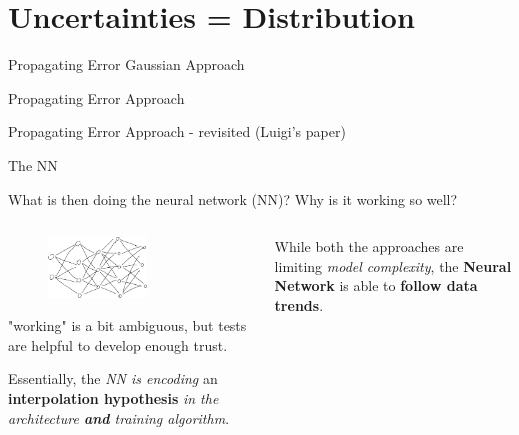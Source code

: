 \documentclass[9pt]{beamer}
\begin{document}
\section{Uncertainties = Distribution}

\begin{frame}{Propagating Error}
    Gaussian Approach
\end{frame}

\begin{frame}{Propagating Error}
    \nnpdf{} Approach
\end{frame}

\begin{frame}{Propagating Error}
    \nnpdf{} Approach - revisited (Luigi's paper)
\end{frame}


\begin{frame}{The NN}
    \begin{center}
        What is then doing the neural network (NN)? Why is it working so well?
    \end{center}
    \vspace*{10pt}

    \begin{columns}
        \begin{column}{0.5\textwidth}
            \begin{figure}
                \centering
                \includegraphics[width=0.6\textwidth]{nn}
            \end{figure}
            "working" is a bit ambiguous, but tests are helpful to develop
            enough trust.

            \vspace*{10pt}
                Essentially, the \textit{NN is encoding} an
                \alert{\textbf{interpolation hypothesis}} \textit{in the
                architecture \textbf{and} training algorithm}.
        \end{column}
        \begin{column}{0.5\textwidth}
            While both the approaches are limiting \textit{model complexity},
            the \textbf{Neural Network} is able to \textbf{follow data trends}.


\end{column}
\end{columns}
\end{frame}
\end{document}
